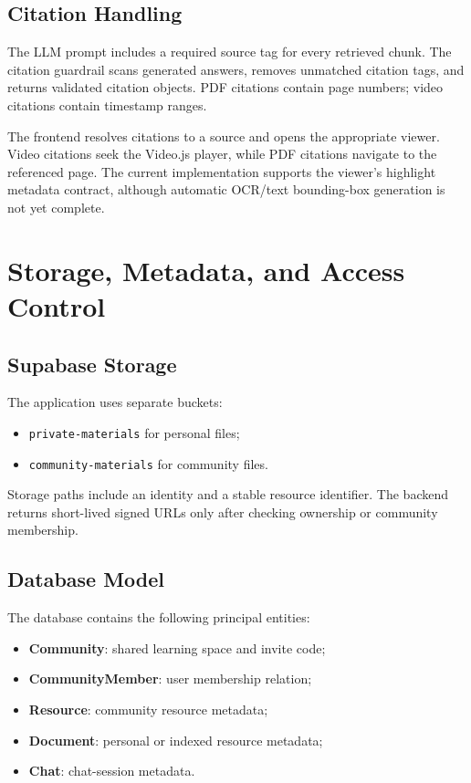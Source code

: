 \documentclass[11pt,a4paper]{article}
\begin{document}
\subsection{Citation Handling}

The LLM prompt includes a required source tag for every retrieved chunk. The
citation guardrail scans generated answers, removes unmatched citation tags,
and returns validated citation objects. PDF citations contain page numbers;
video citations contain timestamp ranges.

The frontend resolves citations to a source and opens the appropriate viewer.
Video citations seek the Video.js player, while PDF citations navigate to the
referenced page. The current implementation supports the viewer's highlight
metadata contract, although automatic OCR/text bounding-box generation is not
yet complete.

\section{Storage, Metadata, and Access Control}

\subsection{Supabase Storage}

The application uses separate buckets:

\begin{itemize}[leftmargin=*]
  \item \texttt{private-materials} for personal files;
  \item \texttt{community-materials} for community files.
\end{itemize}

Storage paths include an identity and a stable resource identifier. The
backend returns short-lived signed URLs only after checking ownership or
community membership.

\subsection{Database Model}

The database contains the following principal entities:

\begin{itemize}[leftmargin=*]
  \item \textbf{Community}: shared learning space and invite code;
  \item \textbf{CommunityMember}: user membership relation;
  \item \textbf{Resource}: community resource metadata;
  \item \textbf{Document}: personal or indexed resource metadata;
  \item \textbf{Chat}: chat-session metadata.
\end{itemize}
\end{document}
